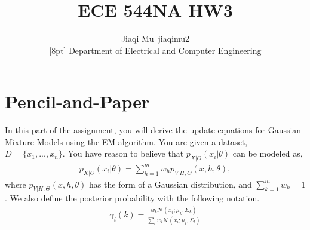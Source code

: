\documentclass[12pt]{article}
\newcommand{\1}{\mathbf{1}}
\begin{document}
{\raggedright


\title{ECE 544NA HW3}%
\author{Jiaqi Mu~jiaqimu2 \\
[8pt]%
Department of Electrical and Computer Engineering} %

\maketitle

\section{Pencil-and-Paper\label{sec:1}}
In this part of the assignment, you will derive the update equations for Gaussian Mixture Models using the EM algorithm. You are given a dataset, $D=\{x_1, ..., x_n\}$. You have reason to believe that $p_{X|\Theta}(x_i | \theta)$ can be modeled as,
\begin{align*}
  p_{X|\Theta}(x_i | \theta) = \sum_{h=1}^m w_h p_{V|H, \Theta}(x, h, \theta),
\end{align*}
where $p_{V|H,\Theta}(x, h, \theta)$ has the form of a Gaussian distribution, and $\sum_{k=1}^m w_k=1$. We also define the posterior probability with the following notation.
\begin{align*}
  \gamma_i(k) = \frac{w_k \mathcal{N}(x_i; \mu_k, \Sigma_k)}{\sum_l w_l \mathcal{N}(x_i; \mu_l, \Sigma_l)}
\end{align*}

}
\end{document}
